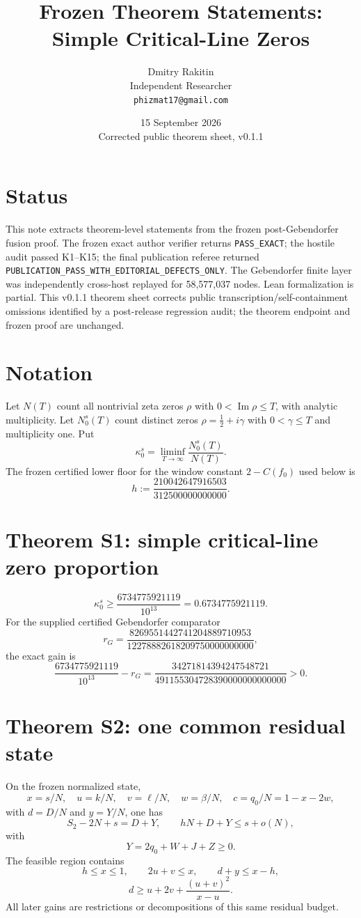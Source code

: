 \documentclass[11pt]{article}
\title{Frozen Theorem Statements:\\Simple Critical-Line Zeros}
\author{Dmitry Rakitin\\Independent Researcher\\\texttt{phizmat17@gmail.com}}
\date{15 September 2026\\Corrected public theorem sheet, v0.1.1}
\begin{document}
\maketitle
\section*{Status}
This note extracts theorem-level statements from the frozen post-Gebendorfer fusion proof.
The frozen exact author verifier returns \texttt{PASS\_EXACT}; the hostile audit passed K1--K15;
the final publication referee returned
\texttt{PUBLICATION\_PASS\_WITH\_EDITORIAL\_DEFECTS\_ONLY}.
The Gebendorfer finite layer was independently cross-host replayed for 58,577,037 nodes.
Lean formalization is partial.
This v0.1.1 theorem sheet corrects public transcription/self-containment omissions identified by a
post-release regression audit; the theorem endpoint and frozen proof are unchanged.

\section*{Notation}
Let $N(T)$ count all nontrivial zeta zeros $\rho$ with
$0<\operatorname{Im}\rho\le T$, with analytic multiplicity. Let $N_0^s(T)$ count distinct
zeros $\rho=\frac12+i\gamma$ with $0<\gamma\le T$ and multiplicity one. Put
\[
\kappa_0^s=\liminf_{T\to\infty}\frac{N_0^s(T)}{N(T)}.
\]
The frozen certified lower floor for the window constant $2-C(f_0)$ used below is
\[
h:=\frac{210042647916503}{312500000000000}.
\]

\section*{Theorem S1: simple critical-line zero proportion}
\[
\boxed{\kappa_0^s\ge\frac{6734775921119}{10^{13}}=0.6734775921119}.
\]
For the supplied certified Gebendorfer comparator
\[
r_G=\frac{8269551442741204889710953}{12278882618209750000000000},
\]
the exact gain is
\[
\frac{6734775921119}{10^{13}}-r_G
=\frac{34271814394247548721}{491155304728390000000000000}>0.
\]

\section*{Theorem S2: one common residual state}
On the frozen normalized state,
\[
x=s/N,\quad u=k/N,\quad v=\ell/N,\quad w=\beta/N,\quad
c=q_0/N=1-x-2w,
\]
with $d=D/N$ and $y=Y/N$, one has
\[
S_2-2N+s=D+Y,\qquad hN+D+Y\le s+o(N),
\]
with
\[
Y=2q_0+W+J+Z\ge0.
\]
The feasible region contains
\[
h\le x\le1,\qquad 2u+v\le x,\qquad d+y\le x-h,
\]
\[
d\ge u+2v+\frac{(u+v)^2}{x-u}.
\]
All later gains are restrictions or decompositions of this same residual budget.
\end{document}
